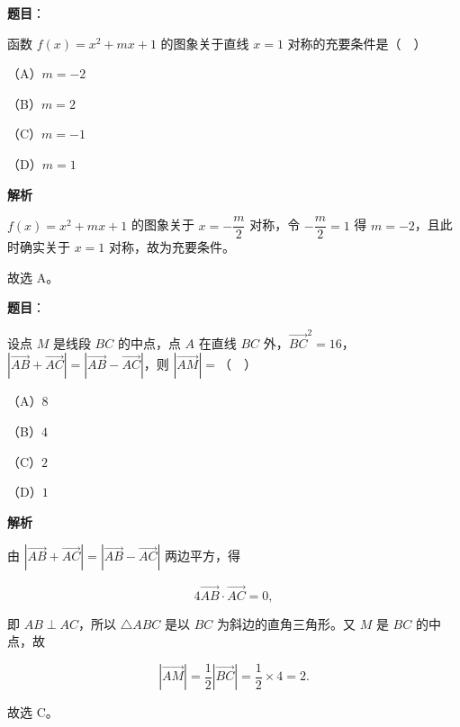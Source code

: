 \begin{answer}

\textbf{题目}：

函数 $f(x)=x^2+mx+1$ 的图象关于直线 $x=1$ 对称的充要条件是（　）

（A）$m=-2$

（B）$m=2$

（C）$m=-1$

（D）$m=1$

\textbf{解析}

$f(x)=x^2+mx+1$ 的图象关于 $x=-\dfrac m2$ 对称，令 $-\dfrac m2=1$ 得 $m=-2$，且此时确实关于 $x=1$ 对称，故为充要条件。

故选 A。


\end{answer}
\begin{answer}

\textbf{题目}：

设点 $M$ 是线段 $BC$ 的中点，点 $A$ 在直线 $BC$ 外，$\overrightarrow{BC}^2=16$，$\left|\overrightarrow{AB}+\overrightarrow{AC}\right|=\left|\overrightarrow{AB}-\overrightarrow{AC}\right|$，则 $\left|\overrightarrow{AM}\right|=$（　）

（A）$8$

（B）$4$

（C）$2$

（D）$1$

\textbf{解析}

由 $\left|\overrightarrow{AB}+\overrightarrow{AC}\right|=\left|\overrightarrow{AB}-\overrightarrow{AC}\right|$ 两边平方，得

\nopagebreak[4]
\[4\overrightarrow{AB}\cdot\overrightarrow{AC}=0,\]

即 $AB\perp AC$，所以 $\triangle ABC$ 是以 $BC$ 为斜边的直角三角形。又 $M$ 是 $BC$ 的中点，故

\nopagebreak[4]
\[\left|\overrightarrow{AM}\right|=\frac12\left|\overrightarrow{BC}\right|=\frac12\times4=2.\]

故选 C。


\end{answer}

